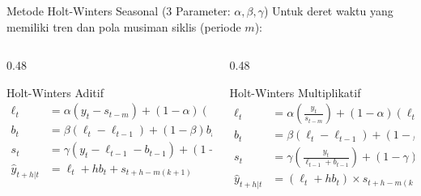 \documentclass[aspectratio=169, 10pt]{beamer}
\begin{document}
\begin{frame}{Metode Holt-Winters Seasonal (3 Parameter: $\alpha, \beta, \gamma$)}
    Untuk deret waktu yang memiliki tren dan pola musiman siklis (periode $m$):
    \begin{columns}[T]
        \begin{column}{0.48\textwidth}
            \begin{block}{Holt-Winters Aditif}
                \begin{align*}
                    \ell_t &= \alpha (y_t - s_{t-m}) + (1 - \alpha)(\ell_{t-1} + b_{t-1}) \\
                    b_t &= \beta (\ell_t - \ell_{t-1}) + (1 - \beta) b_{t-1} \\
                    s_t &= \gamma (y_t - \ell_{t-1} - b_{t-1}) + (1 - \gamma) s_{t-m} \\
                    \hat{y}_{t+h|t} &= \ell_t + h b_t + s_{t+h-m(k+1)}
                \end{align*}
            \end{block}
        \end{column}
        \begin{column}{0.48\textwidth}
            \begin{block}{Holt-Winters Multiplikatif}
                \begin{align*}
                    \ell_t &= \alpha \left(\frac{y_t}{s_{t-m}}\right) + (1 - \alpha)(\ell_{t-1} + b_{t-1}) \\
                    b_t &= \beta (\ell_t - \ell_{t-1}) + (1 - \beta) b_{t-1} \\
                    s_t &= \gamma \left(\frac{y_t}{\ell_{t-1} + b_{t-1}}\right) + (1 - \gamma) s_{t-m} \\
                    \hat{y}_{t+h|t} &= (\ell_t + h b_t) \times s_{t+h-m(k+1)}
                \end{align*}
            \end{block}
        \end{column}
    \end{columns}
\end{frame}
\end{document}
